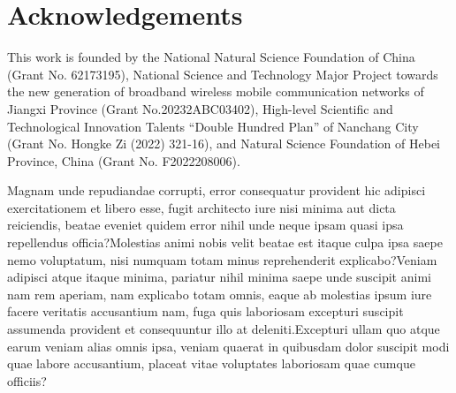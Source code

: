 \documentclass[letterpaper]{article} %
\begin{document}
\section*{Acknowledgements}
This work is founded by the National Natural Science Foundation of China (Grant No. 62173195), National Science and Technology Major Project towards the new generation of broadband wireless mobile communication networks of Jiangxi Province (Grant No.20232ABC03402), High-level Scientific and Technological Innovation Talents ``Double Hundred Plan'' of Nanchang City (Grant No. Hongke Zi (2022) 321-16), and Natural
Science Foundation of Hebei Province, China (Grant No. F2022208006).

Magnam unde repudiandae corrupti, error consequatur provident hic adipisci exercitationem et libero esse, fugit architecto iure nisi minima aut dicta reiciendis, beatae eveniet quidem error nihil unde neque ipsam quasi ipsa repellendus officia?Molestias animi nobis velit beatae est itaque culpa ipsa saepe nemo voluptatum, nisi numquam totam minus reprehenderit explicabo?Veniam adipisci atque itaque minima, pariatur nihil minima saepe unde suscipit animi nam rem aperiam, nam explicabo totam omnis, eaque ab molestias ipsum iure facere veritatis accusantium nam, fuga quis laboriosam excepturi suscipit assumenda provident et consequuntur illo at deleniti.Excepturi ullam quo atque earum veniam alias omnis ipsa, veniam quaerat in quibusdam dolor suscipit modi quae labore accusantium, placeat vitae voluptates laboriosam quae cumque officiis?\clearpage

\end{document}
